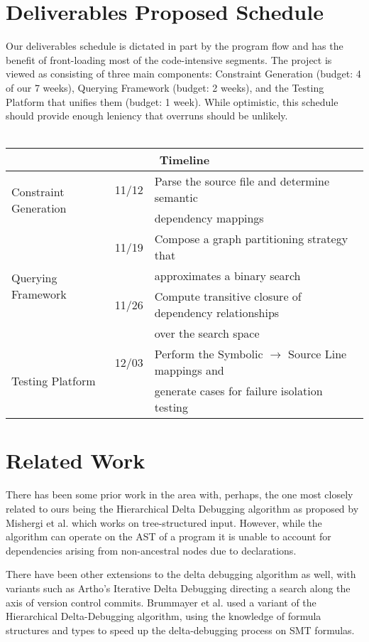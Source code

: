 \documentclass[11pt]{article}
\begin{document}
\section{Deliverables Proposed Schedule}
Our deliverables schedule is dictated in part by the program flow and has the
benefit of front-loading most of the code-intensive segments. The project is
viewed as consisting of three main components: Constraint Generation (budget: 4
of our 7 weeks), Querying Framework (budget: 2 weeks), and the Testing Platform
that unifies them (budget: 1 week). While optimistic, this schedule should
provide enough leniency that overruns should be unlikely.
\\
\\
\begin{tabular}{|l|l|l|}
\hline
\multicolumn{3}{|c|}{Timeline} \\
\hline
\multirow{2}{*}{Constraint Generation} & 11/12 &
Parse the source file and determine semantic \\
 & & dependency mappings \\ \hline
\multirow{4}{*}{Querying Framework} & 11/19 & Compose a graph partitioning
strategy that \\
 & & approximates a binary search \\
 & 11/26 & Compute transitive closure of dependency relationships \\
 & & over the search space \\ \hline
\multirow{2}{*}{Testing Platform} & 12/03 & Perform the Symbolic $\rightarrow$
Source Line mappings and \\
 & & generate cases for failure isolation testing \\ \hline
\end{tabular}



\section{Related Work}
There has been some prior work in the area with, perhaps, the one most closely
related to ours being the Hierarchical Delta Debugging algorithm as proposed by
Mishergi et al. \cite{hdd} which works on tree-structured input. However,
while the algorithm can operate on the AST of a program it is unable to
account for dependencies arising from non-ancestral nodes due to declarations.

There have been other extensions to the delta debugging algorithm as well, with
variants such as Artho's Iterative Delta Debugging \cite{idd} directing a search
along the axis of version control commits. Brummayer et al. \cite{smt} used a 
variant of the Hierarchical Delta-Debugging algorithm, using the knowledge of 
formula structures and types to speed up the delta-debugging process on SMT 
formulas.
\end{document}
